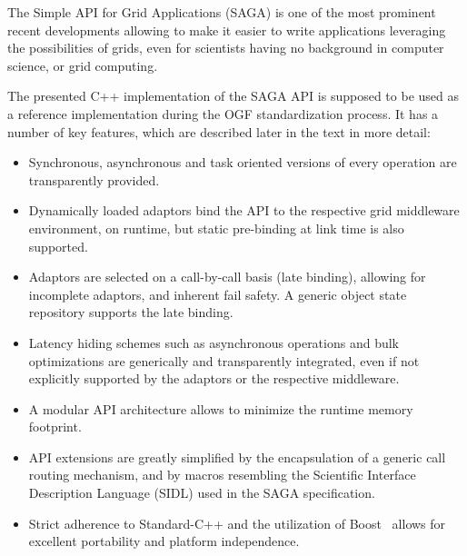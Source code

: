 
  The Simple API for Grid Applications (SAGA) is one of the most
  prominent recent developments allowing to make it easier to write
  applications leveraging the possibilities of grids, even for
  scientists having no background in computer science, or grid computing.
  
  The presented C++ implementation of the SAGA API is supposed to be
  used as a reference implementation during the OGF standardization
  process. It has a number of key features, which are described later
  in the text in more detail:

  \begin{itemize}
     
    \item Synchronous, asynchronous and task oriented versions of every
    operation are transparently provided.

    \item Dynamically loaded adaptors bind the API to the respective
    grid middleware environment, on runtime, but static pre-binding at link
    time is also supported.
          
    \item Adaptors are selected on a call-by-call basis (late
    binding), allowing for incomplete adaptors, and inherent fail
    safety. A generic object state repository supports the late binding.
    
    \item Latency hiding schemes such as asynchronous operations and bulk
    optimizations are generically and transparently integrated, even
    if not explicitly supported by the adaptors or the respective middleware.

		\item A modular API architecture allows to minimize the runtime 
		memory footprint.
		
    \item API extensions are greatly simplified by the encapsulation of a
    generic call routing mechanism, and by macros resembling the 
    Scientific Interface Description Language (SIDL) used in the 
    SAGA specification. 
    
    \item Strict adherence to Standard-C++ and the utilization of 
    Boost~\cite{boost_website} allows for excellent portability 
    and platform independence.

  \end{itemize}

